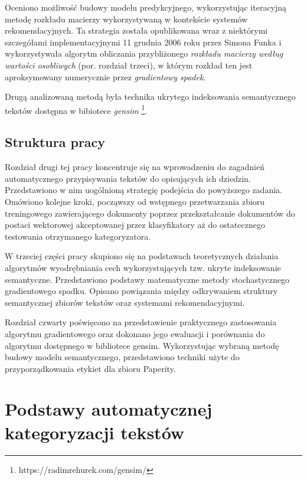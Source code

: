 \documentclass{pracamgr}
\begin{document}
Oceniono możliwość budowy modelu predykcyjnego, wykorzystując iteracyjną metodę rozkładu macierzy wykorzystywaną w kontekście systemów rekomendacyjnych. Ta strategia została opublikowana wraz z niektórymi szczegółami implementacyjnymi 11 grudnia 2006 roku przez Simona Funka \cite{funk} i wykorzystywała algorytm obliczania przybliżonego \textit{rozkładu macierzy według wartości osobliwych} (por. rozdział trzeci), w którym rozkład ten jest aproksymowany numerycznie przez \textit{gradientowy spadek}.

Drugą analizowaną metodą była technika ukrytego indeksowania semantycznego tekstów dostępna w bibiotece \textit{gensim} \footnote{https://radimrehurek.com/gensim/}.

\section{Struktura pracy}

Rozdział drugi tej pracy koncentruje się na wprowadzeniu do zagadnień automatycznego przypisywania tekstów do opisujących ich dziedzin. Przedstawiono w nim uogólnioną strategię podejścia do powyższego zadania. Omówiono kolejne kroki, począwszy od wstępnego przetwarzania zbioru treningowego zawierającego dokumenty poprzez przekształcanie dokumentów do postaci wektorowej akceptowanej przez klasyfikatory aż do ostatecznego testowania otrzymanego kategoryzatora.

W trzeciej części pracy skupiono się na podstawach teoretycznych działania algorytmów wyodrębniania cech wykorzystujących tzw. ukryte indeksowanie semantyczne. Przedstawiono podstawy matematyczne metody stochastycznego gradientowego spadku. Opisano powiązania między odkrywaniem struktury semantycznej zbiorów tekstów oraz systemami rekomendacyjnymi.

Rozdział czwarty poświęcono na przedstawienie praktycznego zastosowania algorytmu gradientowego oraz dokonano jego ewaluacji i porównania do algorytmu dostępnego w bibliotece gensim. Wykorzystując wybraną metodę budowy modelu semantycznego, przedstawiono techniki użyte do przyporządkowania etykiet dla zbioru Paperity.

\chapter{Podstawy automatycznej kategoryzacji tekstów}
\end{document}
